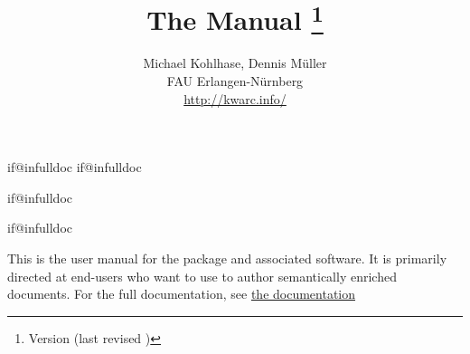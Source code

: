 \makeatletter
\ifcsname if@infulldoc\endcsname\else
    \expandafter\newif\csname if@infulldoc\endcsname\@infulldocfalse
\fi
\makeatother

\csname if@infulldoc\endcsname\else

\def\bibfolder{../lib/bib}



\infulldoctrue


  \csname if@infulldoc\endcsname\else
	\title{
		The {} Manual
		\thanks{Version {\fileversion} (last revised {\filedate})}
 	}
	\author{Michael Kohlhase, Dennis Müller\\
		FAU Erlangen-Nürnberg\\
		\url{http://kwarc.info/}
	}
	\maketitle
	
	\bigskip

  This is the user manual for the \sTeX package and 
  associated software. It is primarily directed at end-users 
  who want to use \sTeX to author semantically
  enriched documents. For the full documentation, see
  \href{\basedocurl/stex.pdf}{the \sTeX documentation}
	
